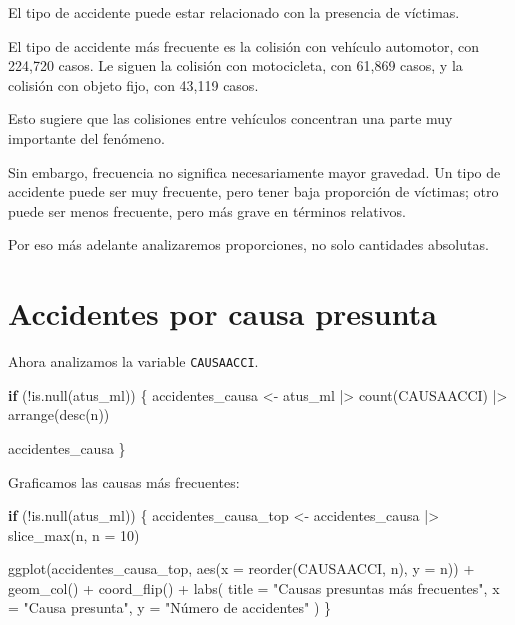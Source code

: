 \documentclass[
  11pt,
  letterpaper,
]{book}
\newenvironment{Shaded}{\begin{snugshade}}{\end{snugshade}}
\newcommand{\AttributeTok}[1]{\textcolor[rgb]{0.40,0.45,0.13}{#1}}
\newcommand{\ControlFlowTok}[1]{\textcolor[rgb]{0.00,0.23,0.31}{\textbf{#1}}}
\newcommand{\DecValTok}[1]{\textcolor[rgb]{0.68,0.00,0.00}{#1}}
\newcommand{\FunctionTok}[1]{\textcolor[rgb]{0.28,0.35,0.67}{#1}}
\newcommand{\NormalTok}[1]{\textcolor[rgb]{0.00,0.23,0.31}{#1}}
\newcommand{\OtherTok}[1]{\textcolor[rgb]{0.00,0.23,0.31}{#1}}
\newcommand{\SpecialCharTok}[1]{\textcolor[rgb]{0.37,0.37,0.37}{#1}}
\newcommand{\StringTok}[1]{\textcolor[rgb]{0.13,0.47,0.30}{#1}}
\begin{document}
El tipo de accidente puede estar relacionado con la presencia de
víctimas.

El tipo de accidente más frecuente es la colisión con vehículo
automotor, con 224,720 casos. Le siguen la colisión con motocicleta, con
61,869 casos, y la colisión con objeto fijo, con 43,119 casos.

Esto sugiere que las colisiones entre vehículos concentran una parte muy
importante del fenómeno.

Sin embargo, frecuencia no significa necesariamente mayor gravedad. Un
tipo de accidente puede ser muy frecuente, pero tener baja proporción de
víctimas; otro puede ser menos frecuente, pero más grave en términos
relativos.

Por eso más adelante analizaremos proporciones, no solo cantidades
absolutas.

\section{Accidentes por causa
presunta}\label{accidentes-por-causa-presunta}

Ahora analizamos la variable \texttt{CAUSAACCI}.

\begin{Shaded}
\begin{Highlighting}[]
\ControlFlowTok{if}\NormalTok{ (}\SpecialCharTok{!}\FunctionTok{is.null}\NormalTok{(atus\_ml)) \{}
\NormalTok{  accidentes\_causa }\OtherTok{\textless{}{-}}\NormalTok{ atus\_ml }\SpecialCharTok{|\textgreater{}}
    \FunctionTok{count}\NormalTok{(CAUSAACCI) }\SpecialCharTok{|\textgreater{}}
    \FunctionTok{arrange}\NormalTok{(}\FunctionTok{desc}\NormalTok{(n))}

\NormalTok{  accidentes\_causa}
\NormalTok{\}}
\end{Highlighting}
\end{Shaded}

Graficamos las causas más frecuentes:

\begin{Shaded}
\begin{Highlighting}[]
\ControlFlowTok{if}\NormalTok{ (}\SpecialCharTok{!}\FunctionTok{is.null}\NormalTok{(atus\_ml)) \{}
\NormalTok{  accidentes\_causa\_top }\OtherTok{\textless{}{-}}\NormalTok{ accidentes\_causa }\SpecialCharTok{|\textgreater{}}
    \FunctionTok{slice\_max}\NormalTok{(n, }\AttributeTok{n =} \DecValTok{10}\NormalTok{)}

  \FunctionTok{ggplot}\NormalTok{(accidentes\_causa\_top, }\FunctionTok{aes}\NormalTok{(}\AttributeTok{x =} \FunctionTok{reorder}\NormalTok{(CAUSAACCI, n), }\AttributeTok{y =}\NormalTok{ n)) }\SpecialCharTok{+}
    \FunctionTok{geom\_col}\NormalTok{() }\SpecialCharTok{+}
    \FunctionTok{coord\_flip}\NormalTok{() }\SpecialCharTok{+}
    \FunctionTok{labs}\NormalTok{(}
      \AttributeTok{title =} \StringTok{"Causas presuntas más frecuentes"}\NormalTok{,}
      \AttributeTok{x =} \StringTok{"Causa presunta"}\NormalTok{,}
      \AttributeTok{y =} \StringTok{"Número de accidentes"}
\NormalTok{    )}
\NormalTok{\}}
\end{Highlighting}
\end{Shaded}
\end{document}
